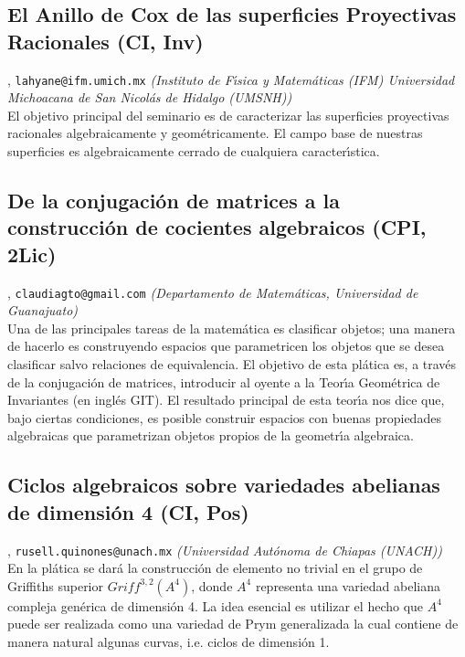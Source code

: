 \subsection{\sffamily El Anillo de Cox de las superficies Proyectivas Racionales {\footnotesize (CI, Inv)}} \label{reg-1072} 
, {\tt lahyane@ifm.umich.mx}  {\slshape (Instituto de F\'\i sica y Matem\'aticas (IFM) Universidad Michoacana de San Nicol\'as de Hidalgo (UMSNH))}\\
          \noindent El objetivo principal del seminario es de caracterizar las superficies proyectivas racionales algebraicamente y geom\'etricamente. El campo base de nuestras superficies es algebraicamente cerrado de cualquiera caracter\'\i stica.
\subsection{\sffamily De la conjugaci\'on de matrices a la construcci\'on de cocientes algebraicos {\footnotesize (CPI, 2Lic)}} \label{reg-408} 
, {\tt claudiagto@gmail.com}  {\slshape (Departamento de Matem\'aticas, Universidad de Guanajuato)}\\
          \noindent Una de las principales tareas de la matem\'atica es clasificar objetos; una manera de hacerlo es construyendo espacios que parametricen los  objetos que se desea clasificar salvo relaciones de equivalencia. El objetivo de esta pl\'atica es, a trav\'es de la conjugaci\'on de matrices,  introducir al oyente a la Teor\'\i a Geom\'etrica de Invariantes (en ingl\'es  GIT). El resultado principal de esta teor\'\i a nos dice que, bajo ciertas  condiciones, es posible construir espacios con buenas propiedades  algebraicas que parametrizan objetos propios de la geometr\'\i a algebraica.
\subsection{\sffamily Ciclos algebraicos sobre variedades abelianas de dimensi\'on 4 {\footnotesize (CI, Pos)}} \label{reg-644} 
, {\tt rusell.quinones@unach.mx}  {\slshape (Universidad Aut\'onoma de Chiapas (UNACH))}\\
          \noindent En la pl\'atica se dar\'a la construcci\'on de elemento no trivial en el grupo de Griffiths superior $Griff^{3,2}(A^4)$, donde $A^4$ representa una variedad abeliana compleja gen\'erica de dimensi\'on 4. La idea esencial es utilizar el hecho que $A^4$ puede ser realizada como una variedad de Prym generalizada la cual contiene de manera natural algunas curvas, i.e. ciclos de dimensi\'on 1.
